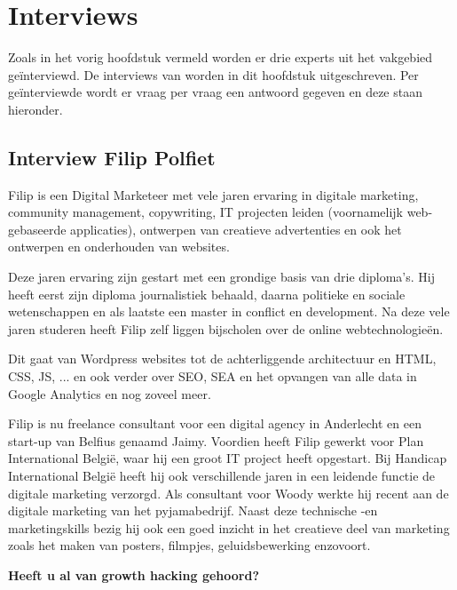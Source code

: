 
\chapter{Interviews}
\label{ch:interviews}

Zoals in het vorig hoofdstuk vermeld worden er drie experts uit het vakgebied geïnterviewd. De interviews van worden in dit hoofdstuk uitgeschreven. Per geïnterviewde wordt er vraag per vraag een antwoord gegeven en deze staan hieronder. 

\section{Interview Filip Polfiet}
\label{sec:interview-filip}

Filip is een Digital Marketeer met vele jaren ervaring in digitale marketing, community management, copywriting, IT projecten leiden (voornamelijk web-gebaseerde applicaties), ontwerpen van creatieve advertenties en ook het ontwerpen en onderhouden van websites. 

Deze jaren ervaring zijn gestart met een grondige basis van drie diploma's. Hij heeft eerst zijn diploma journalistiek behaald, daarna politieke en sociale wetenschappen en als laatste een master in conflict en development. Na deze vele jaren studeren heeft Filip zelf liggen bijscholen over de online webtechnologieën. 

Dit gaat van Wordpress websites tot de achterliggende architectuur en HTML, CSS, JS, ... en ook verder over SEO, SEA en het opvangen van alle data in Google Analytics en nog zoveel meer. 

Filip is nu freelance consultant voor een digital agency in Anderlecht en een start-up van Belfius genaamd Jaimy. Voordien heeft Filip gewerkt voor Plan International België, waar hij een groot IT project heeft opgestart. Bij Handicap International België heeft hij ook verschillende jaren in een leidende functie de digitale marketing verzorgd. Als consultant voor Woody werkte hij recent aan de digitale marketing van het pyjamabedrijf. Naast deze technische -en marketingskills bezig hij ook een goed inzicht in het creatieve deel van marketing zoals het maken van posters, filmpjes, geluidsbewerking enzovoort.

\textbf{Heeft u al van growth hacking gehoord?}
	
